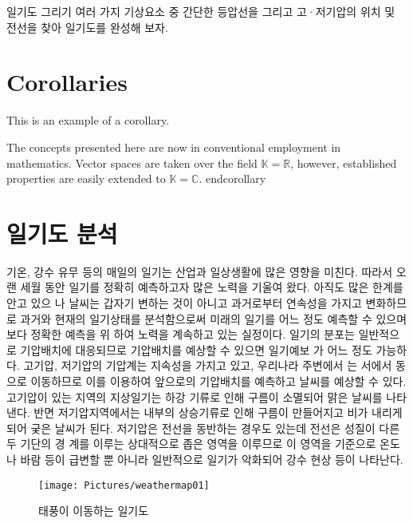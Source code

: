 일기도 그리기
여러 가지 기상요소 중 간단한 등압선을 그리고 고·저기압의 위치 및 전선을 찾아 일기도를 완성해 보자.




\section{Corollaries}

This is an example of a corollary.

\begin{corollary}
	The concepts presented here are now in conventional employment in mathematics. Vector spaces are taken over the field $\mathbb{K}=\mathbb{R}$, however, established properties are easily extended to $\mathbb{K}=\mathbb{C}$.
	end{corollary}
	
	
	\section{일기도 분석}
	
	기온, 강수 유무 등의 매일의 일기는 산업과 일상생활에 많은 영향을 미친다. 따라서 오랜
	세월 동안 일기를 정확히 예측하고자 많은 노력을 기울여 왔다. 아직도 많은 한계를 안고 있으
	나 날씨는 갑자기 변하는 것이 아니고 과거로부터 연속성을 가지고 변화하므로 과거와 현재의
	일기상태를 분석함으로써 미래의 일기를 어느 정도 예측할 수 있으며 보다 정확한 예측을 위
	하여 노력을 계속하고 있는 실정이다.
	일기의 분포는 일반적으로 기압배치에 대응되므로 기압배치를 예상할 수 있으면 일기예보
	가 어느 정도 가능하다. 고기압, 저기압의 기압계는 지속성을 가지고 있고, 우리나라 주변에서
	는 서에서 동으로 이동하므로 이를 이용하여 앞으로의 기압배치를 예측하고 날씨를 예상할 수
	있다. 고기압이 있는 지역의 지상일기는 하강 기류로 인해 구름이 소멸되어 맑은 날씨를 나타
	낸다. 반면 저기압지역에서는 내부의 상승기류로 인해 구름이 만들어지고 비가 내리게 되어
	궂은 날씨가 된다. 저기압은 전선을 동반하는 경우도 있는데 전선은 성질이 다른 두 기단의 경
	계를 이루는 상대적으로 좁은 영역을 이루므로 이 영역을 기준으로 온도나 바람 등이 급변할
	뿐 아니라 일반적으로 일기가 악화되어 강수 현상 등이 나타난다.
	
	\begin{figure}
		\centering
		\texttt{[image: Pictures/weathermap01]}
		\caption{태풍이 이동하는 일기도}
		\label{fig:weathermap01}
	\end{figure}
	

\end{corollary}
